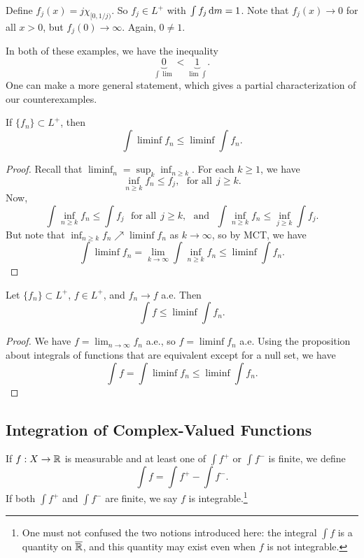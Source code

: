\documentclass[12pt]{article} %
\begin{document}
\begin{example}
    Define $f_j(x) = j \chi_{[0, 1/j)}$. So $f_j \in L^+$ with $\int f_j \, \mathrm{d} m = 1$. Note that $f_j(x) \to 0$ for all $x > 0$, but $f_j(0) \to \infty$. Again, $0 \neq 1$. 
\end{example}

\noindent In both of these examples, we have the inequality \[\underbrace{0}_{\int \lim} < \underbrace{1}_{\lim \int}.\] One can make a more general statement, which gives a partial characterization of our counterexamples.

\begin{lemma}[Fatou]
    If $\{f_n\} \subset L^+$, then \[\int \liminf f_n \leq \liminf \int f_n.\]
\end{lemma}

\begin{proof}
    Recall that $\liminf_n = \sup_k \inf_{n \geq k}$. For each $k \geq 1$, we have \[\inf_{n \geq k} f_n \leq f_j, \ \ \ \text{for all} \ \ j \geq k.\] Now, \[\int \inf_{n \geq k} f_n \leq \int f_j \ \ \ \text{for all} \ \ j \geq k, \ \ \ \text{and} \ \ \ \int \inf_{n \geq k} f_n \leq \inf_{j \geq k} \int f_j.\] But note that $\inf_{n \geq k} f_n \nearrow \liminf f_n$ as $k \to \infty$, so by MCT, we have \[\int \liminf f_n = \lim_{k \to \infty} \int \inf_{n \geq k} f_n \leq \liminf \int f_n.\]
\end{proof}

\begin{corollary}
    Let $\{f_n\} \subset L^+$, $f \in L^+$, and $f_n \to f$ a.e. Then \[\int f \leq \liminf \int f_n.\]
\end{corollary}

\begin{proof}
    We have $f = \lim_{n \to \infty} f_n$ a.e., so $f = \liminf f_n$ a.e. Using the proposition about integrals of functions that are equivalent except for a null set, we have \[\int f = \int \liminf f_n \leq \liminf \int f_n.\]
\end{proof}

\subsection{Integration of Complex-Valued Functions}

\begin{definition}
    If $f : X \to \mathbb{R}$ is measurable and at least one of $\int f^+$ or $\int f^-$ is finite, we define \[\int f = \int f^+ - \int f^-.\] If both $\int f^+$ and $\int f^-$ are finite, we say $f$ is integrable.\footnote{One must not confused the two notions introduced here: the integral $\int f$ is a quantity on $\overline{\mathbb{R}}$, and this quantity may exist even when $f$ is not integrable.}
\end{definition}
\end{document}
